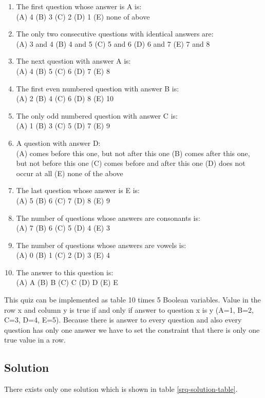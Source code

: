 \begin{enumerate}
	\item The first question whose answer is A is:\\
		(A) 4 (B) 3 (C) 2 (D) 1 (E) none of above
	\item The only two consecutive questions with identical answers are: \\
		(A) 3 and 4 (B) 4 and 5 (C) 5 and 6 (D) 6 and 7 (E) 7 and 8
	\item The next question with answer A is: \\
		(A) 4 (B) 5 (C) 6 (D) 7 (E) 8
	\item The first even numbered question with answer B is: \\
		(A) 2 (B) 4 (C) 6 (D) 8 (E) 10 
	\item The only odd numbered question with answer C is: \\
		(A) 1 (B) 3 (C) 5 (D) 7 (E) 9
	\item A question with answer D: \\
		(A) comes before this one, but not after this one (B) comes after this one, but not before this one (C) comes before and after this one (D) does not occur at all (E) none of the above
	\item The last question whose answer is E is: \\
		(A) 5 (B) 6 (C) 7 (D) 8 (E) 9
	\item The number of questions whose answers are consonants is: \\
		(A) 7 (B) 6 (C) 5 (D) 4 (E) 3
	\item The number of questions whose answers are vowels is: \\
		(A) 0 (B) 1 (C) 2 (D) 3 (E) 4
	\item The answer to this question is: \\
		(A) A (B) B (C) C (D) D (E) E
\end{enumerate}
This quiz can be implemented as table 10 times 5 Boolean variables. Value in the row x and column y is true if and only if answer to question x is y (A=1, B=2, C=3, D=4, E=5). Because there is answer to every question and also every question has only one answer we have to set the constraint that there is only one true value in a row. 

\subsection{Solution}
There exists only one solution which is shown in table \ref{srq-solution-table}.

